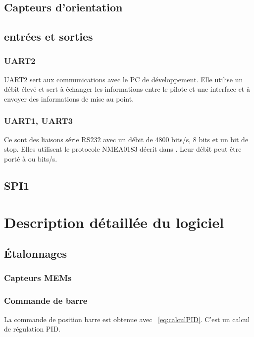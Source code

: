 \documentclass[a4paper,11pt]{report}
\begin{document}
\section{Capteurs d'orientation}

\section{entrées et sorties}

\subsection{UART2}
UART2 sert aux communications avec le PC de développement.
Elle utilise un débit élevé et sert à échanger les informations
entre le pilote et une interface et à envoyer des informations
de mise au point.

\subsection{UART1, UART3}
Ce sont des liaisons série RS232 avec un débit de 4800 bits/s,
8 bits et un bit de stop. Elles utilisent le protocole NMEA0183
décrit dans \cite[NMEA révélé][]{NMEARevealed}.
Leur débit peut être porté à  ou  bits/s.

\section{SPI1}


\chapter{Description détaillée du logiciel}

\section{Étalonnages}

\subsection{Capteurs MEMs}

\subsection{Commande de barre}
La commande de position barre est obtenue avec ~\eqref{eq:calculPID}.
C'est un calcul de régulation PID.
\end{document}
